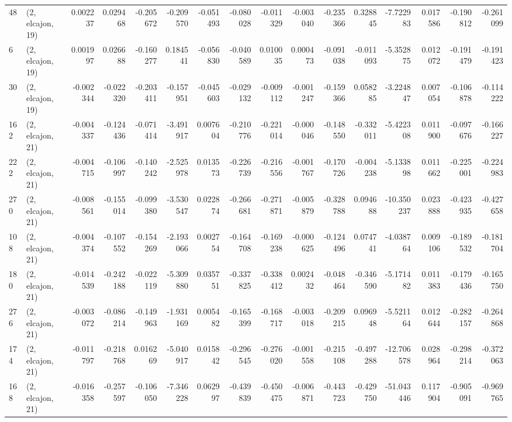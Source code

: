 \begin{tabular}{llrrrrrrrrrrrrrr}
48  &  (2, elcajon, 19) &   0.002237 &  0.029468 & -0.205672 &   -0.209570 & -0.051493 &  -0.080028 & -0.011329 & -0.003040 & -0.235366 &  0.328845 &   -7.722983 &  0.017586 & -0.190812 & -0.261099 \\
6   &  (2, elcajon, 19) &   0.001997 &  0.026688 & -0.160277 &    0.184541 & -0.056830 &  -0.040589 &  0.010035 &  0.000473 & -0.091038 & -0.011093 &   -5.352875 &  0.012072 & -0.191479 & -0.191423 \\
30  &  (2, elcajon, 19) &  -0.002344 & -0.022320 & -0.203411 &   -0.157951 & -0.045603 &  -0.029132 & -0.009112 & -0.001247 & -0.159366 &  0.058285 &   -3.224847 &  0.007054 & -0.106878 & -0.114222 \\
162 &  (2, elcajon, 21) &  -0.004337 & -0.124436 & -0.071414 &   -3.491917 &  0.007604 &  -0.210776 & -0.221014 & -0.000046 & -0.148550 & -0.332011 &   -5.422308 &  0.011900 & -0.097676 & -0.166227 \\
222 &  (2, elcajon, 21) &  -0.004715 & -0.106997 & -0.140242 &   -2.525978 &  0.013573 &  -0.226739 & -0.216556 & -0.001767 & -0.170726 & -0.004238 &   -5.133898 &  0.011662 & -0.225001 & -0.224983 \\
270 &  (2, elcajon, 21) &  -0.008561 & -0.155014 & -0.099380 &   -3.530547 &  0.022874 &  -0.266681 & -0.271871 & -0.005879 & -0.328788 &  0.094688 &  -10.350237 &  0.023888 & -0.423935 & -0.427658 \\
108 &  (2, elcajon, 21) &  -0.004374 & -0.107552 & -0.154269 &   -2.193066 &  0.002754 &  -0.164708 & -0.169238 & -0.000625 & -0.124496 &  0.074741 &   -4.038764 &  0.009106 & -0.189532 & -0.181704 \\
180 &  (2, elcajon, 21) &  -0.014539 & -0.242188 & -0.022119 &   -5.309880 &  0.035751 &  -0.337825 & -0.338412 &  0.002432 & -0.048464 & -0.346590 &   -5.171482 &  0.011383 & -0.179436 & -0.165750 \\
276 &  (2, elcajon, 21) &  -0.003072 & -0.086214 & -0.149963 &   -1.931169 &  0.005482 &  -0.165399 & -0.168717 & -0.003018 & -0.209215 &  0.096948 &   -5.521164 &  0.012644 & -0.282157 & -0.264868 \\
174 &  (2, elcajon, 21) &  -0.011797 & -0.218768 &  0.016269 &   -5.040917 &  0.015842 &  -0.296545 & -0.276020 & -0.001558 & -0.215108 & -0.497288 &  -12.706578 &  0.028964 & -0.298214 & -0.372063 \\
168 &  (2, elcajon, 21) &  -0.016358 & -0.257597 & -0.106050 &   -7.346228 &  0.062997 &  -0.439839 & -0.450475 & -0.006871 & -0.443723 & -0.429750 &  -51.043446 &  0.117904 & -0.905091 & -0.969765 \\

\end{tabular}
